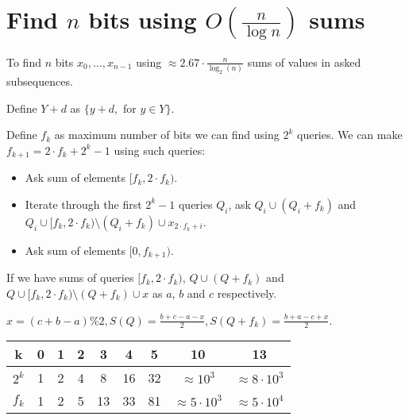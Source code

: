 \section*{Find $n$ bits using $O(\frac{n}{\log n})$ sums}
To find $n$ bits $x_0, \dots, x_{n - 1}$ using $\approx 2.67 \cdot \frac{n}{\log_2(n)}$ sums of values in asked subsequences.

Define $Y + d$ as $\{y + d,$ for $y \in Y\}$.

Define $f_k$ as maximum number of bits we can find using $2^k$ queries.
We can make $f_{k + 1} = 2 \cdot f_k + 2^k - 1$ using such queries:

\begin{itemize}
\item Ask sum of elements $[f_k, 2 \cdot f_k)$.
\item Iterate through the first $2^k - 1$ queries $Q_i$, ask $Q_i \cup (Q_i + f_k)$ and $Q_i \cup [f_k, 2 \cdot f_k) \setminus (Q_i + f_k) \cup x_{2 \cdot f_k + i}$.    
\item Ask sum of elements $[0, f_{k + 1})$.
\end{itemize}


If we have sums of queries $[f_k, 2 \cdot f_k)$, $Q \cup (Q + f_k)$ and $Q \cup [f_k, 2 \cdot f_k) \setminus (Q + f_k) \cup x$ as $a$, $b$ and $c$ respectively. 

$x = (c + b - a) \% 2, S(Q) = \frac{b + c - a - x}{2}, S(Q + f_k) = \frac{b + a - c + x}{2}$.

\begin{tabular}{|c|c|c|c|c|c|c|c|c|}
\hline
k 		& 0 & 1 & 2 & 3  & 4  & 5   & 10     		 		& 13 					 \\
\hline
$2^k$ 	& 1 & 2 & 4 & 8  & 16 & 32 & $\approx 10^3$ 		& $\approx 8 \cdot 10^3$ \\
\hline
$f_k$ 	& 1 & 2 & 5 & 13 & 33 & 81 & $\approx 5 \cdot 10^3$ & $\approx 5 \cdot 10^4$ \\
\hline
\end{tabular}
